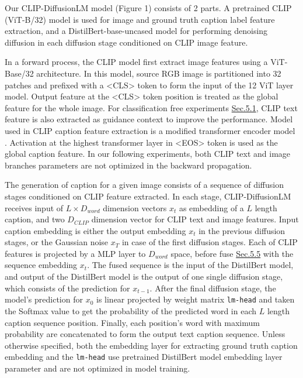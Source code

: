 \documentclass{article}
\begin{document}
Our CLIP-DiffusionLM model (Figure 1) consists of 2 parts. A pretrained CLIP (ViT-B/32) model\cite{clip} is used for image and ground truth caption label feature extraction, and a DistilBert-base-uncased model\cite{distilbert} for performing denoising diffusion in each diffusion stage conditioned on CLIP image feature.

In a forward process, the CLIP model first extract image features using a ViT-Base/32 architecture\cite{vit}. In this model, source RGB image is partitioned into 32 patches and prefixed with a <CLS> token to form the input of the 12 ViT layer model. Output feature at the <CLS> token position is treated as the global feature for the whole image. For classification free experiments \hyperref[sec:classification-free-exp]{Sec.5.1}, CLIP text feature is also extracted as guidance context to improve the performance. Model used in CLIP caption feature extraction is a modified transformer encoder model \cite{gpt, transformer}. Activation at the highest transformer layer in <EOS> token is used as the global caption feature. In our following experiments, both CLIP text and image branches parameters are not optimized in the backward propagation.

The generation of caption for a given image consists of a sequence of diffusion stages conditioned on CLIP feature extracted. In each stage, CLIP-DiffusionLM receives input of $L \times D_{word}$ dimension vectors $x_t$ as embedding of a $L$ length caption, and two $D_{CLIP}$ dimension vector for CLIP text and image features. Input caption embedding is either the output embedding $x_t$ in the previous diffusion stages, or the Gaussian noise $x_T$ in case of the first diffusion stages. Each of CLIP features is projected by a MLP layer to $D_{word}$ space, before fuse \hyperref[sec:fusion-exp]{Sec.5.5} with the sequence embedding $x_t$. The fused sequence is the input of the DistilBert model, and output of the DistilBert model is the output of one single diffusion stage, which consists of the prediction for $x_{t-1}$. After the final diffusion stage, the model's prediction for $x_0$ is linear projected by weight matrix \texttt{lm-head} and taken the Softmax value to get the probability of the predicted word in each $L$ length caption sequence position. Finally, each position's word with maximum probability are concatenated to form the output text caption sequence. Unless otherwise specified, both the embedding layer for extracting ground truth caption embedding and the \texttt{lm-head} use pretrained DistilBert model embedding layer parameter and are not optimized in model training.
\end{document}

